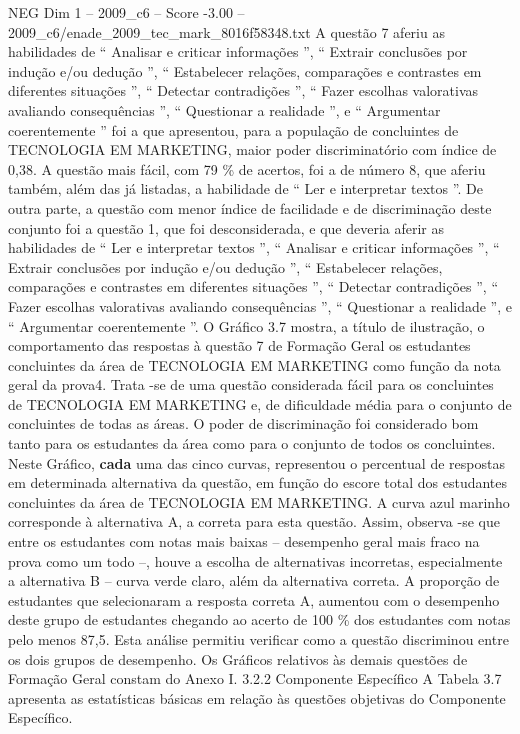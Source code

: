 \begin{textsample}{NEG Dim 1 – 2009\_c6 – Score -3.00 – 2009\_c6/enade\_2009\_tec\_mark\_8016f58348.txt}
A questão 7 aferiu as habilidades de “ Analisar e criticar informações ”, “ Extrair conclusões por indução e/ou dedução ”, “ Estabelecer relações, comparações e contrastes em diferentes situações ”, “ Detectar contradições ”, “ Fazer escolhas valorativas avaliando consequências ”, “ Questionar a realidade ”, e “ Argumentar coerentemente ” foi a que apresentou, para a população de concluintes de TECNOLOGIA EM MARKETING, maior poder discriminatório com índice de 0,38.
A questão mais fácil, com 79 \% de acertos, foi a de número 8, que aferiu também, além das já listadas, a habilidade de “ Ler e interpretar textos ”.
De outra parte, a questão com menor índice de facilidade e de discriminação deste conjunto foi a questão 1, que foi desconsiderada, e que deveria aferir as habilidades de “ Ler e interpretar textos ”, “ Analisar e criticar informações ”, “ Extrair conclusões por indução e/ou dedução ”, “ Estabelecer relações, comparações e contrastes em diferentes situações ”, “ Detectar contradições ”, “ Fazer escolhas valorativas avaliando consequências ”, “ Questionar a realidade ”, e “ Argumentar coerentemente ”.
O Gráfico 3.7 mostra, a título de ilustração, o comportamento das respostas à questão 7 de Formação Geral os estudantes concluintes da área de TECNOLOGIA EM MARKETING como função da nota geral da prova4.
Trata -se de uma questão considerada fácil para os concluintes de TECNOLOGIA EM MARKETING e, de dificuldade média para o conjunto de concluintes de todas as áreas.
O poder de discriminação foi considerado bom tanto para os estudantes da área como para o conjunto de todos os concluintes.
Neste Gráfico, \textbf{cada} uma das cinco curvas, representou o percentual de respostas em determinada alternativa da questão, em função do escore total dos estudantes concluintes da área de TECNOLOGIA EM MARKETING.
A curva azul marinho corresponde à alternativa A, a correta para esta questão.
Assim, observa -se que entre os estudantes com notas mais baixas – desempenho geral mais fraco na prova como um todo –, houve a escolha de alternativas incorretas, especialmente a alternativa B – curva verde claro, além da alternativa correta.
A proporção de estudantes que selecionaram a resposta correta A, aumentou com o desempenho deste grupo de estudantes chegando ao acerto de 100 \% dos estudantes com notas pelo menos 87,5.
Esta análise permitiu verificar como a questão discriminou entre os dois grupos de desempenho.
Os Gráficos relativos às demais questões de Formação Geral constam do Anexo I. 3.2.2 Componente Específico A Tabela 3.7 apresenta as estatísticas básicas em relação às questões objetivas do Componente Específico.

\end{textsample}
